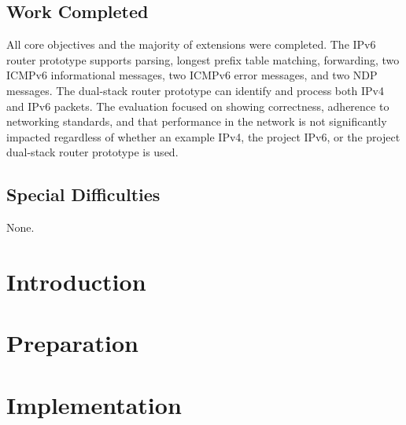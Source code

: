 \documentclass[12pt,a4paper,twoside,openright]{report}
\begin{document}
\section*{Work Completed}
All core objectives and the majority of extensions were completed. The IPv6 router prototype supports parsing, longest prefix table matching, forwarding, two ICMPv6 informational messages, two ICMPv6 error messages, and two NDP messages. The dual-stack router prototype can identify and process both IPv4 and IPv6 packets. The evaluation focused on showing correctness, adherence to networking standards, and that performance in the network is not significantly impacted regardless of whether an example IPv4, the project IPv6, or the project dual-stack router prototype is used.

\section*{Special Difficulties}

None.

\tableofcontents


\newpage
{}
\setcounter{page}{1}





\chapter{Introduction}


\chapter{Preparation}


\chapter{Implementation}

\end{document}
